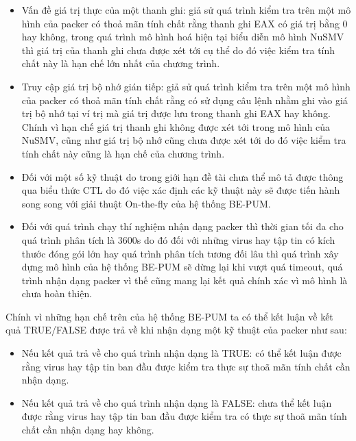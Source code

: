 \begin{itemize}
\item{Vấn đề giá trị thực của một thanh ghi: giả sử quá trình kiểm tra trên một mô hình của packer có thoả mãn tính chất rằng thanh ghi EAX có giá trị bằng 0 hay không, trong quá trình mô hình hoá hiện tại biểu diễn mô hình NuSMV thì giá trị của thanh ghi chưa được xét tới cụ thể do đó việc kiểm tra tính chất này là hạn chế lớn nhất của chương trình.\\}
\item{Truy cập giá trị bộ nhớ gián tiếp: giả sử quá trình kiểm tra trên một mô hình của packer có thoả mãn tính chất rằng có sử dụng câu lệnh nhằm ghi vào giá trị bộ nhớ tại ví trị mà giá trị được lưu trong thanh ghi EAX hay không. Chính vì hạn chế giá trị thanh ghi không được xét tới trong mô hình của NuSMV, cũng như giá trị bộ nhớ cũng chưa được xét tới do đó việc kiểm tra tính chất này cũng là hạn chế của chương trình.\\}
\item{Đối với một số kỹ thuật do trong giới hạn đề tài chưa thể mô tả được thông qua biểu thức CTL do đó việc xác định các kỹ thuật này sẽ được tiến hành song song với giải thuật On-the-fly của hệ thống BE-PUM.\\}
\item{Đối với quá trình chạy thí nghiệm nhận dạng packer thì thời gian tối đa cho quá trình phân tích là 3600s do đó đối với những virus hay tập tin có kích thước đóng gói lớn hay quá trình phân tích tương đối lâu thì quá trình xây dựng mô hình của hệ thống BE-PUM sẽ dừng lại khi vượt quá timeout, quá trình nhận dạng packer vì thế cũng mang lại kết quả chính xác vì mô hình là chưa hoàn thiện.}
\end{itemize}

\hspace{0.5cm}Chính vì những hạn chế trên của hệ thống BE-PUM ta có thể kết luận về kết quả TRUE/FALSE được trả về khi nhận dạng một kỹ thuật của packer như sau:

\begin{itemize}
\item{Nếu kết quả trả về cho quá trình nhận dạng là TRUE: có thể kết luận được rằng virus hay tập tin ban đầu được kiểm tra thực sự thoã mãn tính chất cần nhận dạng.\\}
\item{Nếu kết quả trả về cho quá trình nhận dạng là FALSE: chưa thể kết luận được rằng virus hay tập tin ban đầu được kiểm tra có thực sự thoã mãn tính chất cần nhận dạng hay không.}
\end{itemize}

